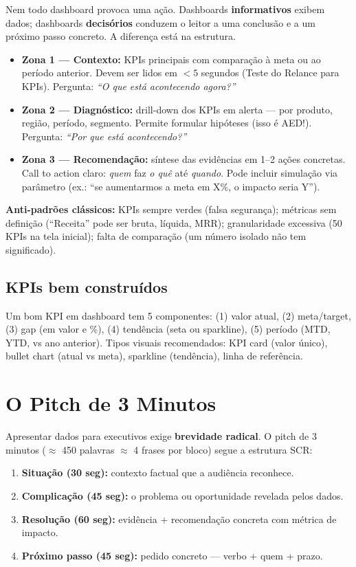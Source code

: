 Nem todo dashboard provoca uma ação. Dashboards \textbf{informativos} exibem dados; dashboards \textbf{decisórios} conduzem o leitor a uma conclusão e a um próximo passo concreto. A diferença está na estrutura.

\begin{itemize}[leftmargin=*]
  \item \textbf{Zona 1 — Contexto:} KPIs principais com comparação à meta ou ao período anterior. Devem ser lidos em $< 5$ segundos (Teste do Relance para KPIs). Pergunta: \textit{``O que está acontecendo agora?''}
  \item \textbf{Zona 2 — Diagnóstico:} drill-down dos KPIs em alerta — por produto, região, período, segmento. Permite formular hipóteses (isso é AED!). Pergunta: \textit{``Por que está acontecendo?''}
  \item \textbf{Zona 3 — Recomendação:} síntese das evidências em 1--2 ações concretas. Call to action claro: \textit{quem} faz \textit{o quê} até \textit{quando}. Pode incluir simulação via parâmetro (ex.: ``se aumentarmos a meta em X\%, o impacto seria Y'').
\end{itemize}

\textbf{Anti-padrões clássicos:} KPIs sempre verdes (falsa segurança); métricas sem definição (``Receita'' pode ser bruta, líquida, MRR); granularidade excessiva (50 KPIs na tela inicial); falta de comparação (um número isolado não tem significado).

\subsection{KPIs bem construídos}
Um bom KPI em dashboard tem 5 componentes: (1) valor atual, (2) meta/target, (3) gap (em valor e \%), (4) tendência (seta ou sparkline), (5) período (MTD, YTD, vs ano anterior). Tipos visuais recomendados: KPI card (valor único), bullet chart (atual vs meta), sparkline (tendência), linha de referência.

\section{O Pitch de 3 Minutos}

Apresentar dados para executivos exige \textbf{brevidade radical}. O pitch de 3 minutos ($\approx$ 450 palavras $\approx$ 4 frases por bloco) segue a estrutura SCR:

\begin{enumerate}[leftmargin=*]
  \item \textbf{Situação (30 seg):} contexto factual que a audiência reconhece.
  \item \textbf{Complicação (45 seg):} o problema ou oportunidade revelada pelos dados.
  \item \textbf{Resolução (60 seg):} evidência + recomendação concreta com métrica de impacto.
  \item \textbf{Próximo passo (45 seg):} pedido concreto — verbo + quem + prazo.
\end{enumerate}

